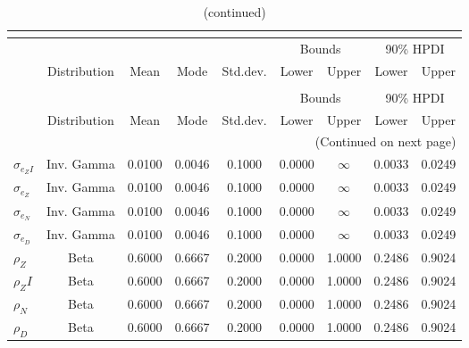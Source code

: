  
\begin{center}
\begin{longtable}{lcccccccc} 
\caption{Prior information (parameters)}\\
 \label{Table:Prior}\\
\toprule%
  &  &  &  &  & \multicolumn{2}{c}{Bounds} & \multicolumn{2}{c}{90\% HPDI} \\ 
  \cmidrule(r{.75em}){6-7} \cmidrule(r{.75em}){8-9}
  & Distribution & Mean & Mode & Std.dev. & Lower & Upper & Lower & Upper  \\ 
\midrule
\endfirsthead
\caption{(continued)}\\
 \toprule%
  &  &  &  &  & \multicolumn{2}{c}{Bounds} & \multicolumn{2}{c}{90\% HPDI} \\ 
  \cmidrule(r{.75em}){6-7} \cmidrule(r{.75em}){8-9}
  & Distribution & Mean & Mode & Std.dev. & Lower & Upper & Lower & Upper  \\ 
\midrule
\endhead
\midrule
\multicolumn{9}{r}{(Continued on next page)} \\ 
\bottomrule
\endfoot
\bottomrule
\endlastfoot
$ \sigma_{{e_ZI}} $ & Inv. Gamma & 0.0100 & 0.0046 & 0.1000 & 0.0000 & $\infty$ & 0.0033 & 0.0249 \\ 
$ \sigma_{{e_Z}} $ & Inv. Gamma & 0.0100 & 0.0046 & 0.1000 & 0.0000 & $\infty$ & 0.0033 & 0.0249 \\ 
$ \sigma_{{e_N}} $ & Inv. Gamma & 0.0100 & 0.0046 & 0.1000 & 0.0000 & $\infty$ & 0.0033 & 0.0249 \\ 
$ \sigma_{{e_D}} $ & Inv. Gamma & 0.0100 & 0.0046 & 0.1000 & 0.0000 & $\infty$ & 0.0033 & 0.0249 \\ 
$ {\rho_Z} $ & Beta & 0.6000 & 0.6667 & 0.2000 & 0.0000 & 1.0000 & 0.2486 & 0.9024 \\ 
$ {\rho_ZI} $ & Beta & 0.6000 & 0.6667 & 0.2000 & 0.0000 & 1.0000 & 0.2486 & 0.9024 \\ 
$ {\rho_N} $ & Beta & 0.6000 & 0.6667 & 0.2000 & 0.0000 & 1.0000 & 0.2486 & 0.9024 \\ 
$ {\rho_D} $ & Beta & 0.6000 & 0.6667 & 0.2000 & 0.0000 & 1.0000 & 0.2486 & 0.9024 \\ 
\end{longtable}
 \end{center}
